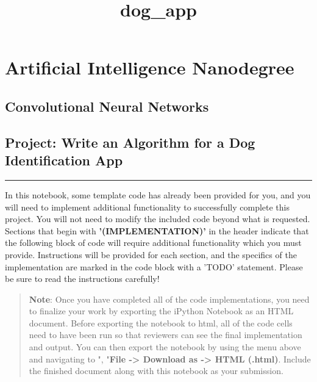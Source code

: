 \documentclass[11pt]{article}
\title{dog\_app}
\begin{document}
    
    
    \maketitle
    
    

    
    \section{Artificial Intelligence
Nanodegree}\label{artificial-intelligence-nanodegree}

\subsection{Convolutional Neural
Networks}\label{convolutional-neural-networks}

\subsection{Project: Write an Algorithm for a Dog Identification
App}\label{project-write-an-algorithm-for-a-dog-identification-app}

\begin{center}\rule{0.5\linewidth}{\linethickness}\end{center}

In this notebook, some template code has already been provided for you,
and you will need to implement additional functionality to successfully
complete this project. You will not need to modify the included code
beyond what is requested. Sections that begin with
\textbf{'(IMPLEMENTATION)'} in the header indicate that the following
block of code will require additional functionality which you must
provide. Instructions will be provided for each section, and the
specifics of the implementation are marked in the code block with a
'TODO' statement. Please be sure to read the instructions carefully!

\begin{quote}
\textbf{Note}: Once you have completed all of the code implementations,
you need to finalize your work by exporting the iPython Notebook as an
HTML document. Before exporting the notebook to html, all of the code
cells need to have been run so that reviewers can see the final
implementation and output. You can then export the notebook by using the
menu above and navigating to \n", "\textbf{File -\textgreater{} Download
as -\textgreater{} HTML (.html)}. Include the finished document along
with this notebook as your submission.
\end{quote}
\end{document}
